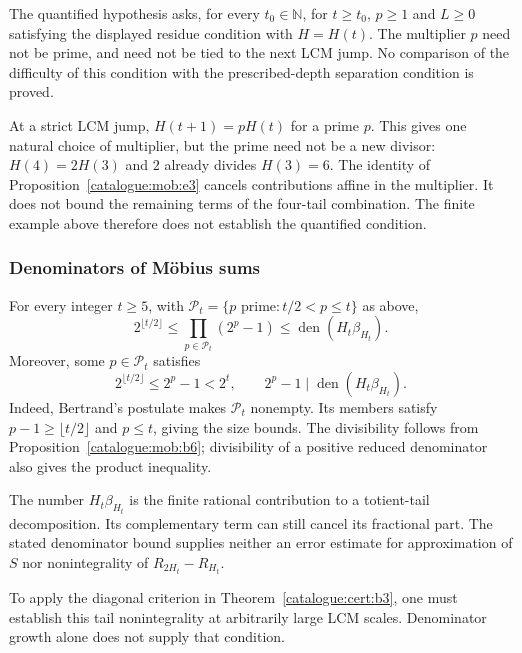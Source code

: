 \begin{rem}
The quantified hypothesis asks, for every $t_0\in\mathbb N$, for
$t\ge t_0$, $p\ge1$ and $L\ge0$ satisfying the displayed residue
condition with $H=H(t)$. The multiplier $p$ need not be prime, and need
not be tied to the next LCM jump. No comparison of the difficulty of
this condition with the prescribed-depth separation condition is proved.

At a strict LCM jump, $H(t+1)=pH(t)$ for a prime $p$. This gives one
natural choice of multiplier, but the prime need not be a new divisor:
$H(4)=2H(3)$ and $2$ already divides $H(3)=6$.
The identity of Proposition~\ref{catalogue:mob:e3}
cancels contributions affine in the multiplier. It does not bound the
remaining terms of the four-tail combination. The finite example above
therefore does not establish the quantified condition.
\end{rem}

\subsubsection{Denominators of M\"obius sums}

\begin{thm}\label{thm:denominators-mobius-sums}
For every integer $t\ge5$, with
$\mathcal P_t=\{p\text{ prime}:t/2<p\le t\}$ as above,
\[
 2^{\lfloor t/2\rfloor}
 \le\prod_{p\in\mathcal P_t}(2^p-1)
 \le\operatorname{den}(H_t\beta_{H_t}).
\]
Moreover, some $p\in\mathcal P_t$ satisfies
\[
 2^{\lfloor t/2\rfloor}\le2^p-1<2^t,
 \qquad 2^p-1\mid\operatorname{den}(H_t\beta_{H_t}).
\]
Indeed, Bertrand's postulate makes $\mathcal P_t$ nonempty. Its members
satisfy $p-1\ge\lfloor t/2\rfloor$ and $p\le t$, giving the size
bounds. The divisibility follows from
Proposition~\ref{catalogue:mob:b6}; divisibility of a positive reduced
denominator also gives the product inequality.
\end{thm}

\begin{rem}
The number $H_t\beta_{H_t}$ is the finite rational contribution to a
totient-tail decomposition. Its complementary term can still cancel
its fractional part. The stated denominator bound supplies neither an
error estimate for approximation of $S$ nor nonintegrality of
$R_{2H_t}-R_{H_t}$.

To apply the diagonal criterion in Theorem~\ref{catalogue:cert:b3},
one must establish this tail nonintegrality at arbitrarily large LCM
scales. Denominator growth alone does not supply that condition.
\end{rem}

